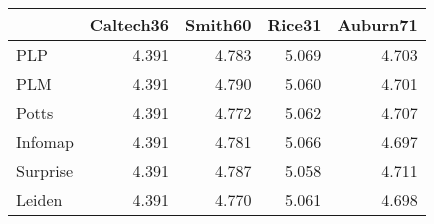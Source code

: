 \begin{tabular}{lrrrr}
\toprule
{} & Caltech36 & Smith60 & Rice31 & Auburn71 \\
\midrule
PLP      &     4.391 &   4.783 &  5.069 &    4.703 \\
PLM      &     4.391 &   4.790 &  5.060 &    4.701 \\
Potts    &     4.391 &   4.772 &  5.062 &    4.707 \\
Infomap  &     4.391 &   4.781 &  5.066 &    4.697 \\
Surprise &     4.391 &   4.787 &  5.058 &    4.711 \\
Leiden   &     4.391 &   4.770 &  5.061 &    4.698 \\
\bottomrule
\end{tabular}
